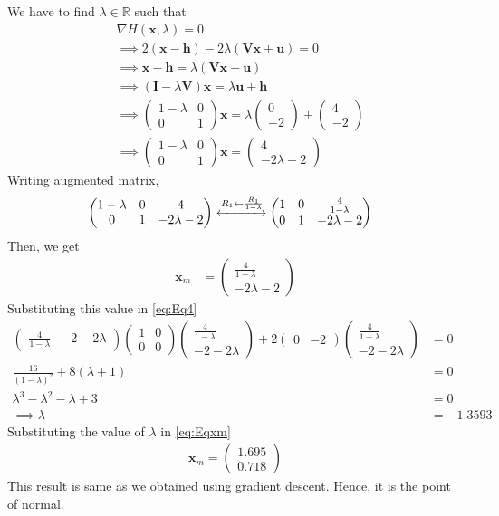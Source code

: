 \documentclass[12pt]{article}
\providecommand{\brak}[1]{\ensuremath{\left(#1\right)}}
\newcommand{\myvec}[1]{\ensuremath{\begin{pmatrix}#1\end{pmatrix}}}
\let\vec\mathbf
\begin{document}
We have to find $\lambda \in \mathbb{R}$ such that
\begin{align}
	&\nabla H\brak{\vec{x},\lambda} = 0 \\
        \label{eq:Eqlambda}
	&\implies 2\brak{\vec{x}-\vec{h}} - 2\lambda\brak{\vec{V}\vec{x}+\vec{u}} = 0 \\
        \label{eq:Eqx}
	&\implies \vec{x} - \vec{h} =  \lambda\brak{\vec{V}\vec{x}+\vec{u}}   \\
	&\implies \brak{\vec{I} - \lambda\vec{V}}\vec{x} =  \lambda\vec{u}+\vec{h} \\ 
	&\implies \myvec{1-\lambda & 0 \\ 0 & 1}\vec{x} = \lambda\myvec{0 \\ -2} + \myvec{4 \\-2} \\ 
        \label{eq:EqL}
	&\implies \myvec{1-\lambda & 0 \\ 0 & 1}\vec{x} = \myvec{4 \\ -2\lambda-2}  
\end{align}
Writing augmented matrix,
\begin{align}
	&\myvec{1-\lambda & 0 & 4\\ 0 & 1 & -2\lambda-2} \xleftrightarrow[]{R_1 \leftarrow \frac{R_1}{1-\lambda}} \myvec{1&0&\frac{4}{1-\lambda}\\0&1&-2\lambda-2}
\end{align}
Then, we get
\begin{align}
        \label{eq:Eqxm}
	\vec{x}_{m} &= \myvec{ \frac{4}{1-\lambda} \\ -2\lambda-2}
\end{align}
Substituting this value in \eqref{eq:Eq4}
\begin{align}
	\myvec{\frac{4}{1-\lambda}&-2-2\lambda}\myvec{1&0\\0&0}\myvec{\frac{4}{1-\lambda}\\-2-2\lambda}+2\myvec{0&-2}\myvec{\frac{4}{1-\lambda}\\-2-2\lambda} &= 0\\
	\frac{16}{\brak{1-\lambda}^2}+8\brak{\lambda+1} &= 0\\
	\lambda^3-\lambda^2-\lambda+3&=0\\
	\implies \lambda &= -1.3593
\end{align}
Substituting the value of $\lambda$ in \eqref{eq:Eqxm}
\begin{align}
	\vec{x}_{m} = \myvec{1.695\\0.718}
\end{align}
This result is same as we obtained using gradient descent. Hence, it is the point of normal.
\end{document}
